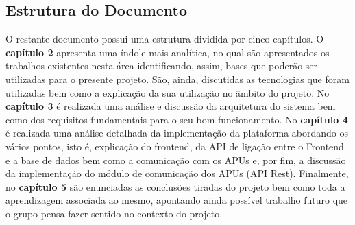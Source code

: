 \subsection{Estrutura do Documento}
O restante documento possui uma estrutura dividida por cinco capítulos. O \textbf{capítulo 2} apresenta uma índole mais analítica, no qual são apresentados os trabalhos existentes nesta área identificando, assim, bases que poderão ser utilizadas para o presente projeto. São, ainda, discutidas as tecnologias que foram utilizadas bem como a explicação da sua utilização no âmbito do projeto. No \textbf{capítulo 3} é realizada uma análise e discussão da arquitetura do sistema bem como dos requisitos fundamentais para o seu bom funcionamento. No \textbf{capítulo 4} é realizada uma análise detalhada da implementação da plataforma abordando os vários pontos, isto é, explicação do frontend, da API de ligação entre o Frontend e a base de dados bem como a comunicação com os APUs e, por fim, a discussão da implementação do módulo de comunicação dos APUs (API Rest). Finalmente, no \textbf{capítulo 5} são enunciadas as conclusões tiradas do projeto bem como toda a aprendizagem associada ao mesmo, apontando ainda possível trabalho futuro que o grupo pensa fazer sentido no contexto do projeto.
\newpage
\hfill\break
